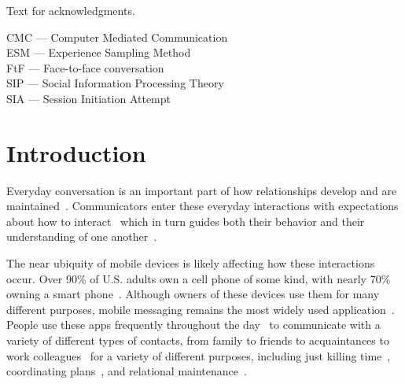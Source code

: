 \documentclass[12pt]{nuthesis}	%
\begin{document}
Text for acknowledgments.



%
\listofabbreviations
\noindent
CMC --- Computer Mediated Communication \\
ESM --- Experience Sampling Method \\
FtF --- Face-to-face conversation \\
SIP --- Social Information Processing Theory \\
SIA --- Session Initiation Attempt
%
%
%
%
%
%
%

\clearpage{} %
\tableofcontents	%

\clearpage{} %
\listoftables		%

\clearpage{} %
\listoffigures		%



\mainmatter             %



\chapter{Introduction}

Everyday conversation is an important part of how relationships develop and are maintained~\citep{baxter1987symbols,duck1999relating}. Communicators enter these everyday interactions with expectations about how to interact~\citep{burgoon1993interpersonal} which in turn guides both their behavior and their understanding of one another~\citep{burgoon1993effects}.

The near ubiquity of mobile devices is likely affecting how these interactions occur. Over 90\% of U.S. adults own a cell phone of some kind, with nearly 70\% owning a smart phone~\citep{anderson2015technology}. Although owners of these devices use them for many different purposes, mobile messaging remains the most widely used application~\citep{duggan2015mobile,smith2015us}. People use these apps frequently throughout the day~\citep{battestini2010large} to communicate with a variety of different types of contacts, from family to friends to acquaintances to work colleagues~\citep{church2013s,min2013mining} for a variety of different purposes, including just killing time~\citep{pielot2015boredom}, coordinating plans~\citep{ling200210}, and relational maintenance~\citep{cui2016beyond,pettegrew2015smart}.
\end{document}
